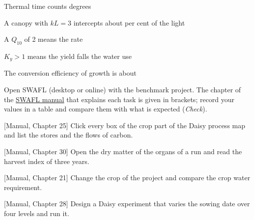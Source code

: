 \begin{exlist}
\item Thermal time counts degrees
\item A canopy with $kL=3$ intercepts about per cent of the light
\item A $Q_{10}$ of 2 means the rate
\item $K_y>1$ means the yield falls the water use
\item The conversion efficiency of growth is about
\end{exlist}
{\small Open SWAFL (desktop or online) with the benchmark project. The chapter of the \href{https://github.com/halilunaziru73-creator/Coupled-Water-Fluxes-Pore-Scale-Dynamics-Precision-Irrigation-Mulching-Feedback-Loops/raw/main/Software/v1.1.0/SWAFL_Desktop/docs/manual_v1.1.0/SWAFL_Manual_v1.1.0.pdf}{SWAFL manual} that explains each task is given in brackets; record your values in a table and compare them with what is expected (\emph{Check}).}\par\vspace{3pt}
\begin{exlist}
\item {\color{khblue}[Manual, Chapter 25]} Click every box of the crop part of the Daisy process map and list the stores and the flows of carbon.\par{}
\item {\color{khblue}[Manual, Chapter 30]} Open the dry matter of the organs of a run and read the harvest index of three years.\par{}
\item {\color{khblue}[Manual, Chapter 21]} Change the crop of the project and compare the crop water requirement.\par{}
\item {\color{khblue}[Manual, Chapter 28]} Design a Daisy experiment that varies the sowing date over four levels and run it.\par{}
\end{exlist}
